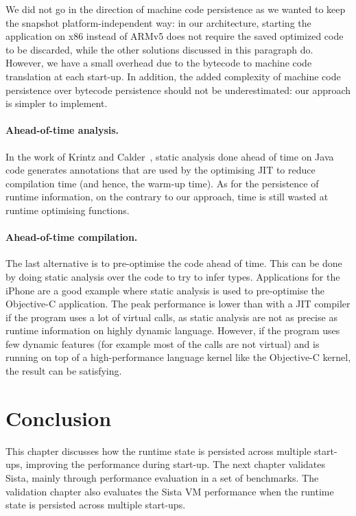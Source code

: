 \documentclass[a4paper,12pt,twoside]{../includes/ThesisStyle}
\begin{document}
We did not go in the direction of machine code persistence as we wanted to keep the snapshot platform-independent way: in our architecture, starting the application on x86 instead of ARMv5 does not require the saved optimized code to be discarded, while the other solutions discussed in this paragraph do. However, we have a small overhead due to the bytecode to machine code translation at each start-up. In addition, the added complexity of machine code persistence over bytecode persistence should not be underestimated: our approach is simpler to implement.

\paragraph{Ahead-of-time analysis.}

In the work of Krintz and Calder~\cite{Krin01a}, static analysis done ahead of time on Java code generates annotations that are used by the optimising JIT to reduce compilation time (and hence, the warm-up time). As for the persistence of runtime information, on the contrary to our approach, time is still wasted at runtime optimising functions.

\paragraph{Ahead-of-time compilation.}

The last alternative is to pre-optimise the code ahead of time. This can be done by doing static analysis over the code to try to infer types. Applications for the iPhone are a good example where static analysis is used to pre-optimise the Objective-C application. The peak performance is lower than with a JIT compiler if the program uses a lot of virtual calls, as static analysis are not as precise as runtime information on highly dynamic language. However, if the program uses few dynamic features (for example most of the calls are not virtual) and is running on top of a high-performance language kernel like the Objective-C kernel, the result can be satisfying.


\section*{Conclusion} This chapter discusses how the runtime state is persisted across multiple start-ups, improving the performance during start-up. The next chapter validates Sista, mainly through performance evaluation in a set of benchmarks. The validation chapter also evaluates the Sista VM performance when the runtime state is persisted across multiple start-ups.

\ifx\wholebook\relax\else
    
\end{document}
